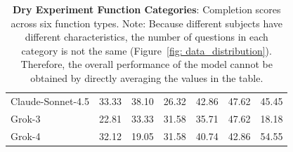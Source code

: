 \begin{table}[t]
{\begin{tabular}{lcccccc}
Claude-Sonnet-4.5 & 33.33 & 38.10 & 26.32 & 42.86 & 47.62 & 45.45 \\
Grok-3 & 22.81 & 33.33 & 31.58 & 35.71 & 47.62 & 18.18 \\
Grok-4 & 32.12 & 19.05 & 31.58 & 40.74 & 42.86 & 54.55 \\
\bottomrule
\end{tabular}
}
\caption{\textbf{Dry Experiment Function Categories}: Completion scores across six function types. Note: Because different subjects have different characteristics, the number of questions in each category is not the same (Figure~\ref{fig: data_distribution}). Therefore, the overall performance of the model cannot be obtained by directly averaging the values in the table.}
\label{tab:dry_task_metric_table}
\end{table}

